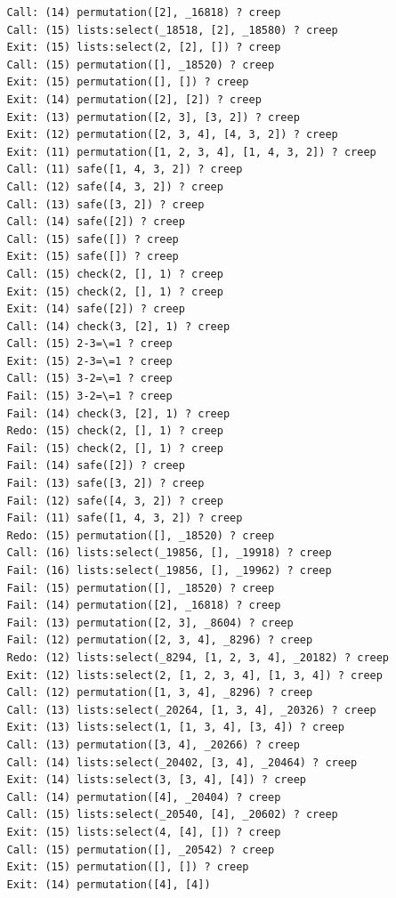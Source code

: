 \documentclass{article}
\begin{document}
\begin{verbatim}
   Call: (14) permutation([2], _16818) ? creep
   Call: (15) lists:select(_18518, [2], _18580) ? creep
   Exit: (15) lists:select(2, [2], []) ? creep
   Call: (15) permutation([], _18520) ? creep
   Exit: (15) permutation([], []) ? creep
   Exit: (14) permutation([2], [2]) ? creep
   Exit: (13) permutation([2, 3], [3, 2]) ? creep
   Exit: (12) permutation([2, 3, 4], [4, 3, 2]) ? creep
   Exit: (11) permutation([1, 2, 3, 4], [1, 4, 3, 2]) ? creep
   Call: (11) safe([1, 4, 3, 2]) ? creep
   Call: (12) safe([4, 3, 2]) ? creep
   Call: (13) safe([3, 2]) ? creep
   Call: (14) safe([2]) ? creep
   Call: (15) safe([]) ? creep
   Exit: (15) safe([]) ? creep
   Call: (15) check(2, [], 1) ? creep
   Exit: (15) check(2, [], 1) ? creep
   Exit: (14) safe([2]) ? creep
   Call: (14) check(3, [2], 1) ? creep
   Call: (15) 2-3=\=1 ? creep
   Exit: (15) 2-3=\=1 ? creep
   Call: (15) 3-2=\=1 ? creep
   Fail: (15) 3-2=\=1 ? creep
   Fail: (14) check(3, [2], 1) ? creep
   Redo: (15) check(2, [], 1) ? creep
   Fail: (15) check(2, [], 1) ? creep
   Fail: (14) safe([2]) ? creep
   Fail: (13) safe([3, 2]) ? creep
   Fail: (12) safe([4, 3, 2]) ? creep
   Fail: (11) safe([1, 4, 3, 2]) ? creep
   Redo: (15) permutation([], _18520) ? creep
   Call: (16) lists:select(_19856, [], _19918) ? creep
   Fail: (16) lists:select(_19856, [], _19962) ? creep
   Fail: (15) permutation([], _18520) ? creep
   Fail: (14) permutation([2], _16818) ? creep
   Fail: (13) permutation([2, 3], _8604) ? creep
   Fail: (12) permutation([2, 3, 4], _8296) ? creep
   Redo: (12) lists:select(_8294, [1, 2, 3, 4], _20182) ? creep
   Exit: (12) lists:select(2, [1, 2, 3, 4], [1, 3, 4]) ? creep
   Call: (12) permutation([1, 3, 4], _8296) ? creep
   Call: (13) lists:select(_20264, [1, 3, 4], _20326) ? creep
   Exit: (13) lists:select(1, [1, 3, 4], [3, 4]) ? creep
   Call: (13) permutation([3, 4], _20266) ? creep
   Call: (14) lists:select(_20402, [3, 4], _20464) ? creep
   Exit: (14) lists:select(3, [3, 4], [4]) ? creep
   Call: (14) permutation([4], _20404) ? creep
   Call: (15) lists:select(_20540, [4], _20602) ? creep
   Exit: (15) lists:select(4, [4], []) ? creep
   Call: (15) permutation([], _20542) ? creep
   Exit: (15) permutation([], []) ? creep
   Exit: (14) permutation([4], [4])



\end{verbatim}
\end{document}
